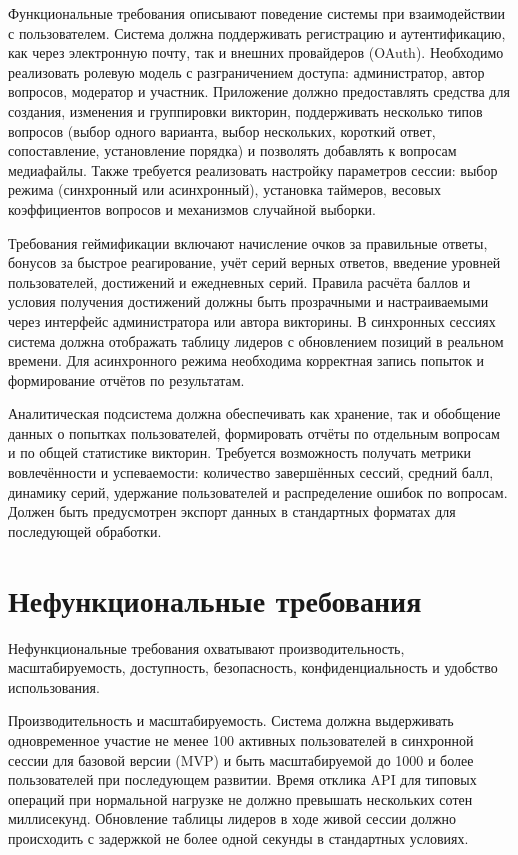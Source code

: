 \documentclass[14pt,a4paper]{extreport}
\begin{document}
Функциональные требования описывают поведение системы при взаимодействии с пользователем. Система должна поддерживать регистрацию и аутентификацию, как через электронную почту, так и внешних провайдеров (OAuth). Необходимо реализовать ролевую модель с разграничением доступа: администратор, автор вопросов, модератор и участник. Приложение должно предоставлять средства для создания, изменения и группировки викторин, поддерживать несколько типов вопросов (выбор одного варианта, выбор нескольких, короткий ответ, сопоставление, установление порядка) и позволять добавлять к вопросам медиафайлы. Также требуется реализовать настройку параметров сессии: выбор режима (синхронный или асинхронный), установка таймеров, весовых коэффициентов вопросов и механизмов случайной выборки.

Требования геймификации включают начисление очков за правильные ответы, бонусов за быстрое реагирование, учёт серий верных ответов, введение уровней пользователей, достижений и ежедневных серий. Правила расчёта баллов и условия получения достижений должны быть прозрачными и настраиваемыми через интерфейс администратора или автора викторины. В синхронных сессиях система должна отображать таблицу лидеров с обновлением позиций в реальном времени. Для асинхронного режима необходима корректная запись попыток и формирование отчётов по результатам.

Аналитическая подсистема должна обеспечивать как хранение, так и обобщение данных о попытках пользователей, формировать отчёты по отдельным вопросам и по общей статистике викторин. Требуется возможность получать метрики вовлечённости и успеваемости: количество завершённых сессий, средний балл, динамику серий, удержание пользователей и распределение ошибок по вопросам. Должен быть предусмотрен экспорт данных в стандартных форматах для последующей обработки.

\section{Нефункциональные требования}

Нефункциональные требования охватывают производительность, масштабируемость, доступность, безопасность, конфиденциальность и удобство использования.

Производительность и масштабируемость. Система должна выдерживать одновременное участие не менее 100 активных пользователей в синхронной сессии для базовой версии (MVP) и быть масштабируемой до 1000 и более пользователей при последующем развитии. Время отклика API для типовых операций при нормальной нагрузке не должно превышать нескольких сотен миллисекунд. Обновление таблицы лидеров в ходе живой сессии должно происходить с задержкой не более одной секунды в стандартных условиях.
\end{document}
